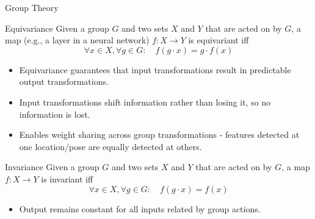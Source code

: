 \documentclass[9pt,dvipsnames]{beamer}
\begin{document}
\begin{frame}{Group Theory}

	\begin{block}{Equivariance}
		Given a group $G$ and two sets $X$ and $Y$ that are acted on by $G$, a map (e.g., a layer in a neural network) $f : X \to Y$ is equivariant iff
		\begin{equation*}
			\forall x \in X, \forall g \in G: \quad f(g \cdot x) = g \cdot f(x)
		\end{equation*}
	\end{block}

	\begin{itemize}
		\item Equivariance guarantees that input transformations result in predictable output transformations.
		\item Input transformations shift information rather than losing it, so no information is lost.
		\item Enables weight sharing across group transformations - features detected at one location/pose are equally detected at others.
	\end{itemize}

	\begin{block}{Invariance}
		Given a group $G$ and two sets $X$ and $Y$ that are acted on by $G$, a map $f : X \to Y$ is invariant iff
		\begin{equation*}
			\forall x \in X, \forall g \in G: \quad f(g \cdot x) = f(x)
		\end{equation*}
	\end{block}

	\begin{itemize}
		\item Output remains constant for all inputs related by group actions.
	\end{itemize}
\end{frame}
\end{document}
